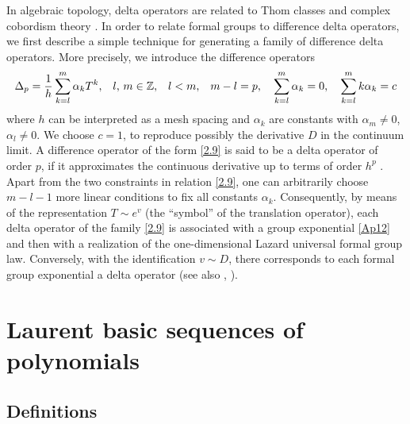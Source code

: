 \documentclass[10pt]{amsart}
\numberwithin{equation}{section}
\theoremstyle{definition}
\begin{document}
In algebraic topology, delta operators are related to Thom classes and
complex cobordism theory \cite{Ray2}. In order to relate formal groups
to difference delta operators, we first describe a simple technique for
generating a family of difference delta operators. More precisely, we introduce
the difference operators
\begin{equation}
\label{2.9}
\Delta _{p}=\frac{1}{h}\sum _{k=l}^{m}\alpha _{k}T^{k}\text{,}\quad l
\text{, }m\in \mathbb{Z}\text{,}\mathbb{\quad}l<m\text{,\quad}m-l=p
\text{,} \quad \sum _{k=l}^{m}\alpha _{k}=0\text{,}\quad \sum _{k=l}^{m}k
\alpha _{k}=c
\end{equation}
where $h$ can be interpreted as a mesh spacing and $\alpha _{k}$  are
constants with $\alpha _{m}\neq 0$, $\alpha _{l}\neq 0$. We choose
$c=1$, to reproduce possibly the derivative $D$ in the continuum limit.
A difference operator of the form \eqref{2.9} is said to be a delta operator of order $p$, if it approximates the continuous derivative up to terms
of order $h^{p}$ \cite{LTW1}. Apart from the two constraints in relation \eqref{2.9}, one can arbitrarily choose $m-l-1$ more linear conditions
to fix all constants $\alpha _{k}$. Consequently, by means of the representation
$T\sim e^{v}$ (the ``symbol'' of the translation operator), each delta
operator of the family \eqref{2.9} is associated with a group exponential  \eqref{Ap12} and then with a realization of the one-dimensional Lazard
universal formal group law. Conversely, with the identification
$v\sim D$, there corresponds to each formal group exponential a delta operator
(see also \cite{Ray}, \cite{TempestaTAMS}).

\section{Laurent basic sequences of polynomials}
\label{sec3}

\subsection{Definitions}
\label{sec3.1}
\end{document}
